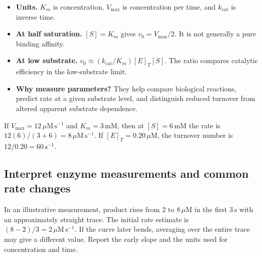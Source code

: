 \documentclass[12pt,a4paper]{article}
\begin{document}
\begin{itemize}[leftmargin=*, itemsep=3pt, topsep=4pt]
  \item \textbf{Units.} $K_m$ is concentration, $V_{\max}$ is concentration per time, and $k_{\mathrm{cat}}$ is inverse time.
  \item \textbf{At half saturation.} $[S]=K_m$ gives $v_0=V_{\max}/2$. It is not generally a pure binding affinity.
  \item \textbf{At low substrate.} $v_0\approx(k_{\mathrm{cat}}/K_m)[E]_T[S]$. The ratio compares catalytic efficiency in the low-substrate limit.
  \item \textbf{Why measure parameters?} They help compare biological reactions, predict rate at a given substrate level, and distinguish reduced turnover from altered apparent substrate dependence.
\end{itemize}
\begin{tcolorbox}[examplebox, title={Calculate rate and turnover}]
If $V_{\max}=12\,\mu\mathrm{M\,s^{-1}}$ and $K_m=3\,\mathrm{mM}$, then at $[S]=6\,\mathrm{mM}$ the rate is $12(6)/(3+6)=8\,\mu\mathrm{M\,s^{-1}}$. If $[E]_T=0.20\,\mu\mathrm M$, the turnover number is $12/0.20=60\,\mathrm{s^{-1}}$.
\end{tcolorbox}

\subsection{Interpret enzyme measurements and common rate changes}
\begin{tcolorbox}[examplebox, title={Convert a time trace into an initial rate}]
In an illustrative measurement, product rises from $2$ to $8\,\mu\mathrm M$ in the first $3\,\mathrm s$ with an approximately straight trace. The initial rate estimate is $(8-2)/3=2\,\mu\mathrm{M\,s^{-1}}$. If the curve later bends, averaging over the entire trace may give a different value. Report the early slope and the units used for concentration and time.
\end{tcolorbox}
\end{document}
